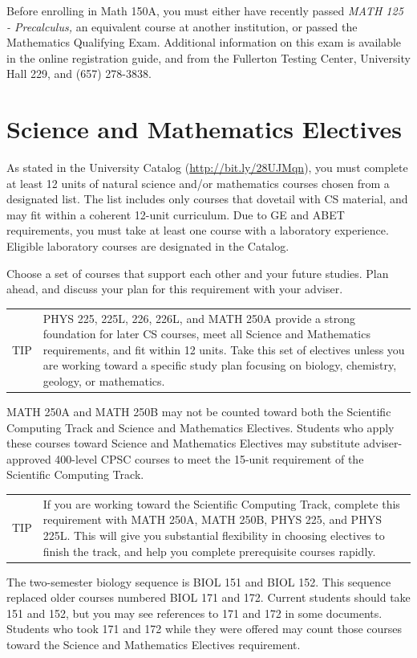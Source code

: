 \documentclass{book}
\newenvironment{tip}{
  \tcolorbox \begin{tabular}{m{.5in} m{5.25in}}
    \Large{TIP} &
}{
  \end{tabular} \endtcolorbox
}
\begin{document}
Before enrolling in Math 150A, you must either have recently passed \emph{MATH 125 - Precalculus,} an equivalent course at another institution, or passed the Mathematics Qualifying Exam. Additional information on this exam is available in the online registration guide, and from the Fullerton Testing Center, University Hall 229, and (657) 278-3838.

\section{Science and Mathematics Electives}

As stated in the University Catalog (\url{http://bit.ly/28UJMqn}), you must complete at least 12 units of natural science and/or mathematics courses chosen from a designated list. The list includes only courses that dovetail with CS material, and may fit within a coherent 12-unit curriculum. Due to GE and ABET requirements, you must take at least one course with a laboratory experience. Eligible laboratory courses are designated in the Catalog.

Choose a set of courses that support each other and your future studies. Plan ahead, and discuss your plan for this requirement with your adviser.

\begin{tip}
PHYS 225, 225L, 226, 226L, and MATH 250A provide a strong foundation for later CS courses, meet all Science and Mathematics requirements, and fit within 12 units. Take this set of electives unless you are working toward a specific study plan focusing on biology, chemistry, geology, or mathematics.
\end{tip}

MATH 250A and MATH 250B may not be counted toward both the Scientific Computing Track \ScTrackIndex and Science and Mathematics Electives. Students who apply these courses toward Science and Mathematics Electives may substitute adviser-approved 400-level CPSC courses to meet the 15-unit requirement of the Scientific Computing Track.

\begin{tip}
If you are working toward the Scientific Computing Track, complete this requirement with  MATH 250A, MATH 250B, PHYS 225, and PHYS 225L. This will give you substantial flexibility in choosing electives to finish the track, and help you complete prerequisite courses rapidly.
\end{tip}

The two-semester biology sequence is BIOL 151 and BIOL 152. This sequence replaced older courses numbered BIOL 171 and 172. Current students should take 151 and 152, but you may see references to 171 and 172 in some documents. Students who took 171 and 172 while they were offered may count those courses toward the Science and Mathematics Electives requirement.
\end{document}
